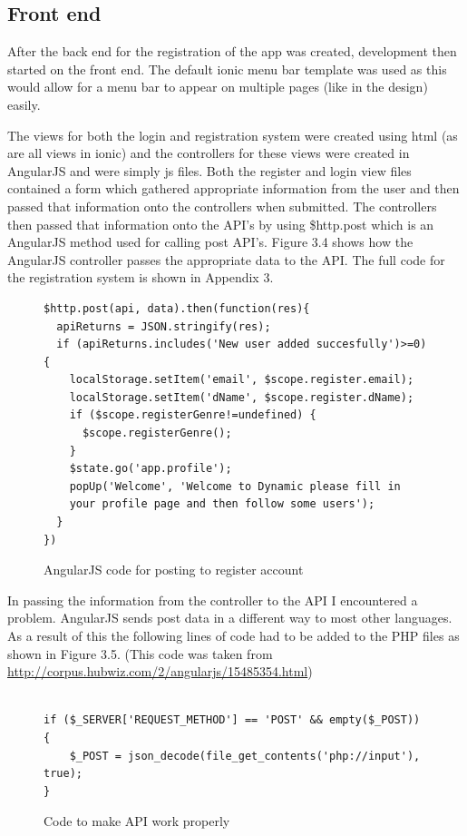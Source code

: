 \subsection{Front end}
After the back end for the registration of the app was created, development then started on the front end. The default ionic menu bar template was used as this would allow for a menu bar to appear on multiple pages (like in the design) easily.

The views for both the login and registration system were created using html (as are all views in ionic) and the controllers for these views were created in AngularJS and were simply js files. Both the register and login view files contained a form which gathered appropriate information from the user and then passed that information onto the controllers when submitted. The controllers then passed that information onto the API's by using \$http.post which is an AngularJS method used for calling post API's. Figure 3.4 shows how the AngularJS controller passes the appropriate data to the API. The full code for the registration system is shown in Appendix 3.
\begin{center}
\begin{figure}[H]
\begin{verbatim}
$http.post(api, data).then(function(res){
  apiReturns = JSON.stringify(res);
  if (apiReturns.includes('New user added succesfully')>=0) {
    localStorage.setItem('email', $scope.register.email);
    localStorage.setItem('dName', $scope.register.dName);
    if ($scope.registerGenre!=undefined) {
      $scope.registerGenre();
    }
    $state.go('app.profile');
    popUp('Welcome', 'Welcome to Dynamic please fill in 
    your profile page and then follow some users');
  }
})
\end{verbatim}
\caption{AngularJS code for posting to register account}
\end{figure}
\end{center}

In passing the information from the controller to the API I encountered a problem. AngularJS sends post data in a different way to most other languages. As a result of this the following lines of code had to be added to the PHP files as shown in Figure 3.5. (This code was taken from \url{http://corpus.hubwiz.com/2/angularjs/15485354.html})
\begin{center} 
\begin{figure}[H]
\begin{verbatim}

if ($_SERVER['REQUEST_METHOD'] == 'POST' && empty($_POST)) {
    $_POST = json_decode(file_get_contents('php://input'), true);
}
\end{verbatim}
\caption{Code to make API work properly}
\end{figure}
\end{center}

